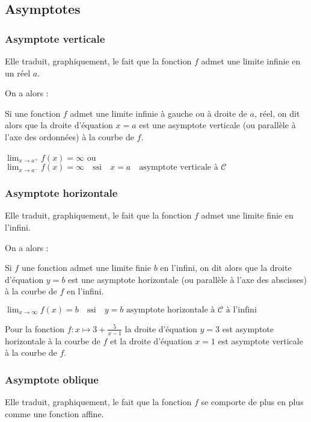 \subsection{Asymptotes}
\subsubsection{Asymptote verticale}
Elle traduit, graphiquement, le fait que la fonction $f$ admet une limite infinie en un réel $a$.

On a alors :

\begin{definition}
Si  une fonction $f$ admet une limite infinie à gauche ou à droite de $a$, réel, on dit alors que la droite d'équation $x=a$ est une asymptote verticale (ou parallèle à l'axe des ordonnées)  à la courbe de $f$.

$\displaystyle\lim_{x \to a^{+}}f(x)=\infty$  ou 
$\displaystyle\lim_{x \to a^{-}}f(x)=\infty\quad \text{ssi}\quad x=a \quad\text{asymptote verticale à }\mathcal{C} $
\end{definition}



\subsubsection{Asymptote horizontale}
Elle traduit, graphiquement, le fait que la fonction $f$ admet une limite finie en l'infini.

On a alors :

\begin{definition}
Si $f$ une fonction admet une limite finie $b$ en l'infini, on dit alors que la droite d'équation $y=b$ est une asymptote horizontale (ou parallèle à l'axe des abscisses) à la courbe de $f$ en l'infini.

$\displaystyle \lim_{x \to \infty}f(x)=b \quad\text{ssi}\quad y=b \text{ asymptote horizontale à }\mathcal{C} \text{ à l'infini}$
\end{definition}

\begin{example}
Pour la fonction $f : x\mapsto 3+ \frac{5}{x-1} $ 
la droite d'équation   $y = 3 $ est asymptote horizontale à la courbe de $f$
et la droite d'équation $x = 1$ est asymptote verticale à la courbe de $f.$

\end{example}
\subsubsection{Asymptote oblique}
Elle traduit, graphiquement, le fait que la fonction $f$ se comporte de plus en plus comme une fonction affine.

